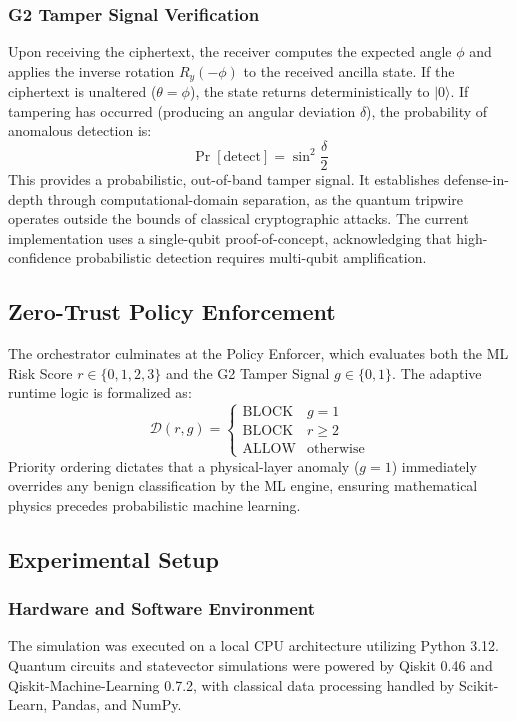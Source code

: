\documentclass[conference]{IEEEtran}
\begin{document}
\subsubsection{G2 Tamper Signal Verification}
Upon receiving the ciphertext, the receiver computes the expected angle $\phi$ and applies the inverse rotation $R_y(-\phi)$ to the received ancilla state. If the ciphertext is unaltered ($\theta = \phi$), the state returns deterministically to $|0\rangle$. If tampering has occurred (producing an angular deviation $\delta$), the probability of anomalous detection is:
\begin{equation}
\Pr[\mathrm{detect}] = \sin^2\frac{\delta}{2}
\end{equation}
This provides a probabilistic, out-of-band tamper signal. It establishes defense-in-depth through computational-domain separation, as the quantum tripwire operates outside the bounds of classical cryptographic attacks. The current implementation uses a single-qubit proof-of-concept, acknowledging that high-confidence probabilistic detection requires multi-qubit amplification.

\subsection{Zero-Trust Policy Enforcement}
The orchestrator culminates at the Policy Enforcer, which evaluates both the ML Risk Score $r \in \{0,1,2,3\}$ and the G2 Tamper Signal $g \in \{0, 1\}$. The adaptive runtime logic is formalized as:
\begin{equation}
\mathcal{D}(r, g) = \begin{cases} \text{BLOCK} & g = 1 \\ \text{BLOCK} & r \ge 2 \\ \text{ALLOW} & \text{otherwise} \end{cases}
\end{equation}
Priority ordering dictates that a physical-layer anomaly ($g=1$) immediately overrides any benign classification by the ML engine, ensuring mathematical physics precedes probabilistic machine learning.

\subsection{Experimental Setup}

\subsubsection{Hardware and Software Environment}
The simulation was executed on a local CPU architecture utilizing Python 3.12. Quantum circuits and statevector simulations were powered by Qiskit 0.46 and Qiskit-Machine-Learning 0.7.2, with classical data processing handled by Scikit-Learn, Pandas, and NumPy.
\end{document}

